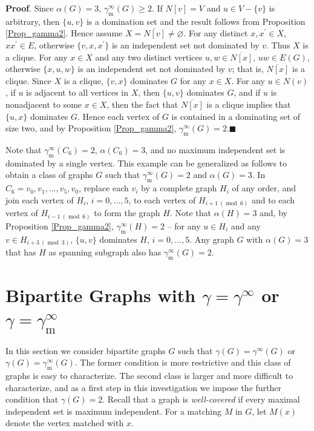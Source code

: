 \documentclass[12pt]{article}%
\begin{document}
\noindent\textbf{Proof}.\hspace{0.1in} Since $\alpha(G)=3$, $\gamma
_{\mathrm{m}}^{\infty}(G)\geq2$. If $N[v]=V$ and $u\in V-\{v\}$ is arbitrary,
then $\{u,v\}$ is a domination set and the result follows from Proposition
\ref{Prop_gamma2}. Hence assume $X=\overline{N[v]}\neq\varnothing$. For any
distinct $x,x^{\prime}\in X$, $xx^{\prime}\in E$, otherwise $\{v,x,x^{\prime
}\}$ is an independent set not dominated by $v$. Thus $X$ is a clique. For any
$x\in X$ and any two distinct vertices $u,w\in\overline{N[x]}$, $uw\in E(G)$,
otherwise $\{x,u,w\}$ is an independent set not dominated by $v$; that is,
$\overline{N[x]}$ is a clique. Since $X$ is a clique, $\{v,x\}$ dominates $G$
for any $x\in X$. For any $u\in N(v)$, if $u$ is adjacent to all vertices in
$X$, then $\{u,v\}$ dominates $G$, and if $u$ is nonadjacent to some $x\in X$,
then the fact that $\overline{N[x]}$ is a clique implies that $\{u,x\}$
dominates $G$. Hence each vertex of $G$ is contained in a dominating set of
size two, and by Proposition \ref{Prop_gamma2}, $\gamma_{\mathrm{m}}^{\infty
}(G)=2$.\hfill$\blacksquare$

\bigskip

Note that $\gamma_{\mathrm{m}}^{\infty}(C_{6})=2$, $\alpha(C_{6})=3$, and no
maximum independent set is dominated by a single vertex. This example can be
generalized as follows to obtain a class of graphs $G$ such that
$\gamma_{\mathrm{m}}^{\infty}(G)=2$ and $\alpha(G)=3$. In $C_{6}=v_{0}%
,v_{1},...,v_{5},v_{0}$, replace each $v_{i}$ by a complete graph $H_{i}$ of
any order, and join each vertex of $H_{i}$, $i=0,...,5$, to each vertex of
$H_{i+1\ (\operatorname{mod}\ 6)}$ and to each vertex of
$H_{i-1\ (\operatorname{mod}\ 6)}$ to form the graph $H$. Note that
$\alpha(H)=3$ and, by Proposition \ref{Prop_gamma2}, $\gamma_{\mathrm{m}%
}^{\infty}(H)=2$ -- for any $u\in H_{i}$ and any $v\in
H_{i+3\ (\operatorname{mod}\ 3)}$, $\{u,v\}$ dominates $H$, $i=0,...,5$. Any
graph $G$ with $\alpha(G)=3$ that has $H$ as spanning subgraph also has
$\gamma_{\mathrm{m}}^{\infty}(G)=2$.

\section{Bipartite Graphs with $\gamma=\gamma^{\infty}$ or $\gamma
=\gamma_{\mathrm{m}}^{\infty}$}

\label{Sec2}In this section we consider bipartite graphs $G$ such that
$\gamma(G)=\gamma^{\infty}(G)$ or $\gamma(G)=\gamma_{\mathrm{m}}^{\infty}(G)$.
The former condition is more restrictive and this class of graphs is easy to
characterize. The second class is larger and more difficult to characterize,
and as a first step in this investigation we impose the further condition that
$\gamma(G)=2$. Recall that a graph is \textit{well-covered} if every maximal
independent set is maximum independent. For a matching $M$ in $G$, let $M(x)$
denote the vertex matched with $x$.
\end{document}
